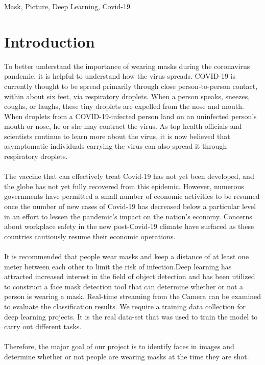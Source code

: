 \documentclass[conference]{IEEEtran}
\begin{document}
\begin{IEEEkeywords}
 Mask, Picture, Deep Learning, Covid-19
\end{IEEEkeywords}

\section{Introduction}
To better understand the importance of wearing masks during the coronavirus pandemic, it is helpful to understand how the virus spreads. COVID-19 is currently thought to be spread primarily through close person-to-person contact, within about six feet, via respiratory droplets. When a person speaks, sneezes, coughs, or laughs, these tiny droplets are expelled from the nose and mouth. When droplets from a COVID-19-infected person land on an uninfected person's mouth or nose, he or she may contract the virus. As top health officials and scientists continue to learn more about the virus, it is now believed that asymptomatic individuals carrying the virus can also spread it through respiratory droplets.
\\
\\
The vaccine that can effectively treat Covid-19 has not yet been developed, and the globe has not yet fully recovered from this epidemic. However, numerous governments have permitted a small number of economic activities to be resumed once the number of new cases of Covid-19 has decreased below a particular level in an effort to lessen the pandemic's impact on the nation's economy. Concerns about workplace safety in the new post-Covid-19 climate have surfaced as these countries cautiously resume their economic operations.
\\
\\
It is recommended that people wear masks and keep a distance of at least one meter between each other to limit the risk of infection.Deep learning has attracted increased interest in the field of object detection and has been utilized to construct a face mask detection tool that can determine whether or not a person is wearing a mask. Real-time streaming from the Camera can be examined to evaluate the classification results. We require a training data collection for deep learning projects. It is the real data-set that was used to train the model to carry out different tasks.
\\
\\
Therefore, the major goal of our project is to identify faces in images and determine whether or not people are wearing masks at the time they are shot.
\end{document}
